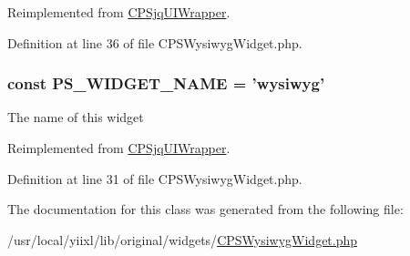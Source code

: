 Reimplemented from \hyperlink{classCPSjqUIWrapper_a8ccb5e1d65c091f944a6aa8c5be834ca}{CPSjqUIWrapper}.



Definition at line 36 of file CPSWysiwygWidget.php.

\hypertarget{classCPSWysiwygWidget_ae357f9dc377f7de0d12010b2ced28cbc}{
\subsubsection[{PS\_\-WIDGET\_\-NAME}]{\setlength{\rightskip}{0pt plus 5cm}const {\bf PS\_\-WIDGET\_\-NAME} = 'wysiwyg'}}
\label{classCPSWysiwygWidget_ae357f9dc377f7de0d12010b2ced28cbc}
The name of this widget 

Reimplemented from \hyperlink{classCPSjqUIWrapper_ae357f9dc377f7de0d12010b2ced28cbc}{CPSjqUIWrapper}.



Definition at line 31 of file CPSWysiwygWidget.php.



The documentation for this class was generated from the following file:\begin{DoxyCompactItemize}
\item 
/usr/local/yiixl/lib/original/widgets/\hyperlink{CPSWysiwygWidget_8php}{CPSWysiwygWidget.php}\end{DoxyCompactItemize}
